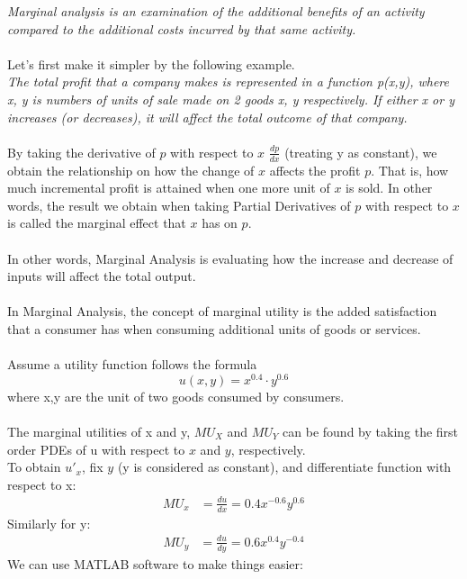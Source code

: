 \documentclass[a4paper]{article}
\begin{document}
\textit{Marginal analysis is an examination of the additional benefits of an activity compared to the additional costs incurred by that same activity.} \\ \\
Let's first make it simpler by the following example. \\
\emph{The total profit that a company makes is represented in a function p(x,y), where x, y is numbers of units of sale made on 2 goods x, y respectively. If either x or y increases (or decreases), it will affect the total outcome of that company.} \\ \\
By taking the derivative of $p$ with respect to $x$ $\frac{dp}{dx}$ (treating y as constant), we obtain the relationship on how the change of $x$ affects the profit $p$. That is, how much incremental profit is attained when one more unit of $x$ is sold. In other words, the result we obtain when taking Partial Derivatives of $p$ with respect to $x$ is called the marginal effect that $x$ has on $p$. \\ \\
In other words, Marginal Analysis is evaluating how the increase and decrease of inputs will affect the total output.\\ \\
In Marginal Analysis, the concept of marginal utility is the added satisfaction that a consumer has when consuming additional units of goods or services. \\ \\
Assume a utility function follows the formula
\begin{equation*}
	u(x,y) = x^{0.4}\cdot y^{0.6}
\end{equation*}
where x,y are the unit of two goods consumed by consumers.\\ \\
The marginal utilities of x and y, $MU_X$ and $MU_Y$ can be found by taking the first order PDEs of u with respect to $x$ and $y$, respectively.\\
To obtain $u'_x$, fix $y$ (y is considered as constant), and differentiate function with respect to x: 
\begin{align*}
	MU_x & = \frac{du}{dx} = 0.4x^{-0.6}y^{0.6} 
\end{align*}
Similarly for y:
\begin{align*}
	MU_y & = \frac{du}{dy} = 0.6x^{0.4}y^{-0.4}
\end{align*}
We can use MATLAB software to make things easier:
\end{document}
